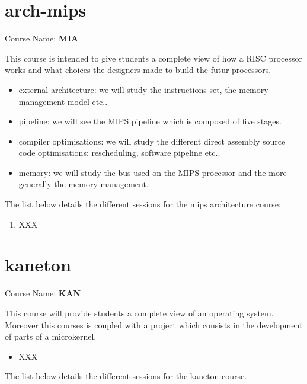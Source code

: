 \begin{multicols}{2}



\section{arch-mips}

Course Name: \textbf{MIA}

This course is intended to give students a complete view of how a RISC
processor works and what choices the designers made to build the futur
processors.

\begin{itemize}
  \item
    external architecture: we will study the instructions set,
    the memory management model etc..
  \item
    pipeline: we will see the MIPS pipeline which is composed of five
    stages.
  \item
    compiler optimisations: we will study the different direct assembly
    source code optimisations: rescheduling, software pipeline etc..
  \item
    memory: we will study the bus used on the MIPS processor and the
    more generally  the memory management.
\end{itemize}

The list below details the different sessions for the mips architecture
course:

\begin{enumerate}
  \item
    XXX
\end{enumerate}



\section{kaneton}

Course Name: \textbf{KAN}

This course will provide students a complete view of an operating system.
Moreover this courses is coupled with a project which consists in the
development of parts of a microkernel.

\begin{itemize}
  \item
    XXX
\end{itemize}

The list below details the different sessions for the kaneton course.


\end{multicols}
